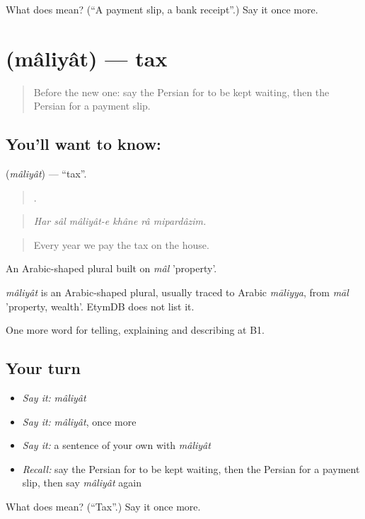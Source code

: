 \begin{tcolorbox}[breakable,colback=teal!4,colframe=teal!35!black,title={Before you move on}]
What does  mean? (\textquotedblleft{}A payment slip, a bank receipt\textquotedblright{}.) Say it once more.
\end{tcolorbox}
\section[\texorpdfstring{\fa{مالیات} (mâliyât)}{مالیات (mâliyât)}]{ (mâliyât) — tax}

\label{lesson:FA-C452-maliyat}



\begin{quote}
Before the new one: say the Persian for to be kept waiting, then the Persian for a payment slip.
\end{quote}

\subsection*{You'll want to know: }
\textbf{} (\emph{mâliyât}) — \textquotedblleft{}tax\textquotedblright{}.

\begin{quote}
     .
\end{quote}

\begin{quote}
\emph{Har sâl mâliyât-e khâne râ mipardâzim.}
\end{quote}

\begin{quote}
Every year we pay the tax on the house.
\end{quote}

An Arabic-shaped plural built on \emph{mâl} 'property'.

\begin{cousinweb}
\emph{mâliyât} is an Arabic-shaped plural, usually traced to Arabic \emph{māliyya}, from \emph{māl} 'property, wealth'. EtymDB does not list it.
\end{cousinweb}

\begin{grammarlens}[title={What you've built}]
One more word for telling, explaining and describing at B1.
\end{grammarlens}

\subsection*{Your turn}
\begin{itemize}
\raggedright
  \item \emph{Say it:} \emph{mâliyât}
  \item \emph{Say it:} \emph{mâliyât}, once more
  \item \emph{Say it:} a sentence of your own with \emph{mâliyât}
  \item \emph{Recall:} say the Persian for to be kept waiting, then the Persian for a payment slip, then say \emph{mâliyât} again
\end{itemize}

\begin{tcolorbox}[breakable,colback=teal!4,colframe=teal!35!black,title={Before you move on}]
What does  mean? (\textquotedblleft{}Tax\textquotedblright{}.) Say it once more.
\end{tcolorbox}
